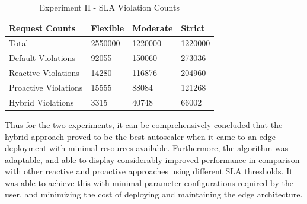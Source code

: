 \begin{table}
    \caption{Experiment II - SLA Violation Counts}\label{tab:exp2-sla-violation-count}
    \centering
    \begin{tabular}{|l|l|l|l|}
        \hline
        Request Counts & Flexible & Moderate & Strict \\
        \hline
        Total  & \num[group-separator={,}]{2550000} & \num[group-separator={,}]{1220000} & \num[group-separator={,}]{1220000} \\
        Default Violations & \num[group-separator={,}]{92055} & \num[group-separator={,}]{150060} & \num[group-separator={,}]{273036} \\
        Reactive Violations & \num[group-separator={,}]{14280} & \num[group-separator={,}]{116876} & \num[group-separator={,}]{204960} \\
        Proactive Violations & \num[group-separator={,}]{15555} & \num[group-separator={,}]{88084} & \num[group-separator={,}]{121268} \\
        Hybrid Violations & \num[group-separator={,}]{3315} & \num[group-separator={,}]{40748} & \num[group-separator={,}]{66002} \\
         \hline
    \end{tabular}
\end{table}

Thus for the two experiments, it can be comprehensively concluded that the hybrid approach proved to be the best autoscaler when it came to an edge deployment with minimal resources available. Furthermore, the algorithm was adaptable, and able to display considerably improved performance in comparison with other reactive and proactive approaches using different SLA thresholds. It was able to achieve this with minimal parameter configurations required by the user, and minimizing the cost of deploying and maintaining the edge architecture.
